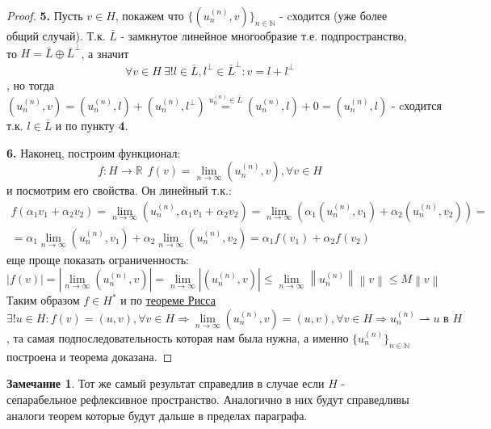 \documentclass[12pt,a4paper]{article}
\theoremstyle{definition}
\newtheorem{corollaryth}{Замечание}[theorem]
\newcommand{\Real}{\mathbb{R}}
\newcommand{\Natural}{\mathbb{N}}
\newcommand{\norm}[1]{\left\lVert#1\right\rVert}
\newcommand{\seq}[2]{\{#1\}_{#2}}
\newcommand{\weakto}{\rightharpoonup}
\begin{document}
\begin{proof}
	\textbf{5.} Пусть $v \in H$, покажем что $\seq{(u_n^{(n)}, v)}{n\in\Natural} \text{ - cходится}$ (уже более общий случай). Т.к. $\bar{L}$ - замкнутое линейное многообразие т.е. подпространство, то $H = \bar{L} \oplus \bar{L}^\perp$, а значит 
	$$\forall v \in H \ \exists! l \in \bar{L}, l^\perp \in \bar{L}^\perp: v = l + l^\perp$$
	, но тогда
	$$(u_n^{(n)}, v) = (u_n^{(n)}, l) + (u_n^{(n)}, l^\perp) \overset{u_n^{(n)} \in \bar{L}}{=} (u_n^{(n)}, l) + 0 = (u_n^{(n)}, l) \text{ - cходится}$$
	т.к. $l \in \bar{L}$ и по пункту \textbf{4}.
	
	\textbf{6.} Наконец, построим функционал:
	\begin{equation*}
		f: H \to \Real \ \ f(v) = \lim_{n \to \infty}{(u_n^{(n)}, v)}, \forall v \in H
	\end{equation*}
	и посмотрим его свойства. Он линейный т.к.:
	\begin{multline*}
		f(\alpha_1 v_1 + \alpha_2 v_2) = \lim_{n\to\infty}{(u_n^{(n)}, \alpha_1 v_1 + \alpha_2 v_2)} = \lim_{n\to\infty}{\left(\alpha_1 (u_n^{(n)}, v_1) + \alpha_2 (u_n^{(n)},v_2)\right)} = \\ = 
		\alpha_1 \lim_{n\to\infty}{(u_n^{(n)}, v_1)} + \alpha_2 \lim_{n\to\infty}{(u_n^{(n)}, v_2)} = \alpha_1 f(v_1) + \alpha_2 f(v_2) 
	\end{multline*}
	еще проще показать ограниченность:
	\begin{equation*}
		|f(v)| = \left|\lim_{n\to\infty}{(u_n^{(n)}, v)}\right| = \lim_{n\to\infty}{|(u_n^{(n)}, v)|} \leq \lim_{n\to\infty}{\norm{u_n^{(n)}}\norm{v}} \leq M\norm{v}
	\end{equation*}
	Таким образом $f \in H^*$ и по \hyperref[th:2]{теореме Рисса} $$\exists! u \in H: f(v) = (u, v), \forall v \in H \Rightarrow \lim_{n\to\infty}{(u_n^{(n)}, v)} = (u, v), \forall v \in H \Rightarrow u_n^{(n)} \weakto u \text{ в } H$$
	, та самая подпоследовательность которая нам была нужна, а именно $\seq{u_n^{(n)}}{n\in\Natural}$ построена и теорема доказана.
\end{proof}
\begin{corollaryth}
	Тот же самый результат справедлив в случае если $H$ - сепарабельное рефлексивное пространство. Аналогично в них будут справедливы аналоги теорем которые будут дальше в пределах параграфа.
\end{corollaryth}
\end{document}
